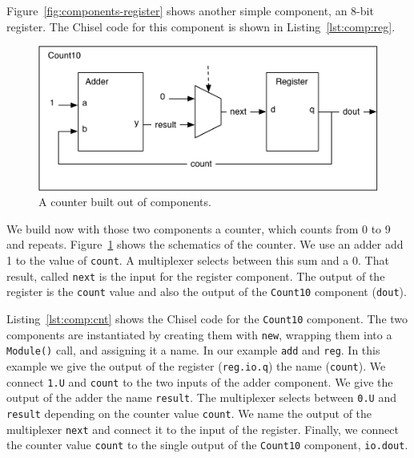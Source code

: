 \documentclass[%
    10pt,
    headinclude, footexclude,
    openright, %
    notitlepage,
    cleardoubleempty,
    headsepline,
    pointlessnumbers,
    bibtotoc, idxtotoc,
    ]{scrbook}
\newcommand{\code}[1]{{\small{\texttt{#1}}}}
\newcommand{\scale}{0.7}
\begin{document}

Figure~\ref{fig:components-register} shows another simple component, an 8-bit register.
The Chisel code for this component is shown in Listing~\ref{lst:comp:reg}.


\begin{figure}
  \centering
  \includegraphics[scale=\scale]{figures/components-counter}
  \caption{A counter built out of components.}
  \label{fig:components-counter}
\end{figure}


We build now with those two components a counter, which counts from 0 to 9 and repeats.
Figure~\ref{fig:components-counter} shows the schematics of the counter. We use an adder
add 1 to the value of \code{count}. A multiplexer selects between this sum and a 0.
That result, called \code{next} is the input for the register component. The output of the
register is the \code{count} value and also the output of the \code{Count10} component (\code{dout}).

Listing~\ref{lst:comp:cnt} shows the Chisel code for the \code{Count10} component.
The two components are instantiated by creating them with \code{new}, wrapping them
into a \code{Module()} call, and assigning it a name. In our example \code{add} and \code{reg}.
In this example we give the output of the register (\code{reg.io.q}) the name (\code{count}).
We connect \code{1.U} and \code{count} to the two inputs of the adder component.
We give the output of the adder the name \code{result}.
The multiplexer selects between \code{0.U} and \code{result} depending on the counter
value \code{count}. We name the output of the multiplexer \code{next} and connect it
to the input of the register. Finally, we connect the counter value \code{count}
to the single output of the \code{Count10} component, \code{io.dout}.
\end{document}
